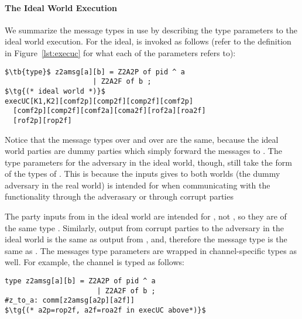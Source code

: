 \paragraph{The Ideal World Execution}
We summarize the message types in use by describing the type parameters to the ideal world execution.
For the ideal,  is invoked as follows (refer to the  definition in Figure~\ref{lst:execuc} for what each of the parameters refers to):
\begin{lstlisting}[basicstyle=\small\BeraMonottFamily, frame=single, mathescape]
$\tb{type}$ z2amsg[a][b] = Z2A2P of pid ^ a 
                     | Z2A2F of b ;
$\tg{(* ideal world *)}$
execUC[K1,K2][comf2p][comp2f][comp2f][comf2p]
  [comf2p][comp2f][comf2a][coma2f][rof2a][roa2f]
  [rof2p][rop2f]
\end{lstlisting}
Notice that the message types over  and over  are the same, because the ideal world parties are dummy parties which simply forward the messages to \Fcom.
The type parameters for the adversary in the ideal world, though, still take the form of the types of \Fro.
This is because the inputs \Z gives to both worlds (the dummy adversary in the real world) is intended for \Fro when communicating with the functionality through the adverasary or through corrupt parties 

The party inputs from  in the ideal world are intended for \Fcom, not \Fro, so they are of the same type .
Similarly, output from corrupt parties to the adversary in the ideal world is the same as output from \Fcom, and, therefore the message type is the same as .
The messages type parameters are wrapped in channel-specific types as well.
For example, the channel  is typed as follows:
\begin{lstlisting}[basicstyle=\small\BeraMonottFamily, frame=single, mathescape]
type z2amsg[a][b] = Z2A2P of pid ^ a
                      | Z2A2F of b ;
#z_to_a: comm[z2amsg[a2p][a2f]]
$\tg{(* a2p=rop2f, a2f=roa2f in execUC above*)}$
\end{lstlisting}

